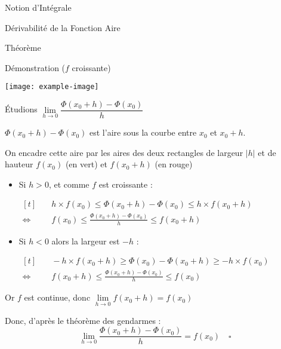 \documentclass{cours}
\begin{document}
\begin{Gpartie}{Notion d'Intégrale}
\begin{Spartie}{Dérivabilité de la Fonction Aire}
\begin{SSpartie}{Théorème}
\begin{SSSpartie}{Démonstration \big($f$ croissante\big)}
                    \begin{center}
                            \texttt{[image: example-image]}
                        \parbox{\linewidth}{}
                    \end{center}

                    Étudions $\lim\limits_{h\to0}\dfrac{\Phi\left(x_0+h\right)-\Phi\left(x_0\right)}{h}$

                    $\Phi\left(x_0+h\right)-\Phi(x_0)$ est l'aire sous la courbe entre $x_0$ et $x_0+h$.

                    On encadre cette aire par les aires des deux rectangles de largeur $\lvert h\rvert$ et de hauteur $f(x_0)$ (en vert) et $f(x_0+h)$ (en rouge)

                    \begin{itemize}
                        \item Si $h>0$, et comme $f$ est croissante :
                        
                        $\begin{aligned}[t]
                            &\quad h\times f(x_0)\leq\Phi\left(x_0+h\right)-\Phi(x_0)\leq h\times f(x_0+h) \\
                            \iff&\quad f(x_0)\leq \frac{\Phi\left(x_0+h\right)-\Phi(x_0)}{h}\leq f(x_0+h) 
                        \end{aligned}$

                        \item Si $h<0$ alors la largeur est $-h$ :
                        
                        $\begin{aligned}[t]
                            &\quad -h\times f(x_0+h)\geq\Phi(x_0)-\Phi(x_0+h)\geq -h\times f(x_0) \\
                            \iff&\quad f(x_0+h)\leq\frac{\Phi\left(x_0+h\right)-\Phi(x_0)}{h}\leq f(x_0)
                        \end{aligned}$
                    \end{itemize}
                    Or $f$ est continue, donc $\lim\limits_{h\to0}f(x_0+h)=f(x_0)$

                    Donc, d'après le théorème des gendarmes : \[\lim\limits_{h\to0}\frac{\Phi\left(x_0+h\right)-\Phi(x_0)}{h}=f(x_0)\quad\square\]


\end{SSSpartie}
\end{SSpartie}
\end{Spartie}
\end{Gpartie}
\end{document}
